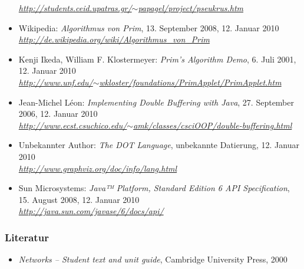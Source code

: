 \documentclass[a4paper,titlepage]{article}
\begin{document}
\begin{itemize}
	\emph{\href{http://students.ceid.upatras.gr/~papagel/project/pseukrus.htm}{http://students.ceid.upatras.gr/$\sim$papagel/project/pseukrus.htm}}
\item Wikipedia: \emph{Algorithmus von Prim}, 13. September 2008, 12. Januar 2010 \\
	\emph{\href{http://de.wikipedia.org/wiki/Algorithmus_von_Prim}{http://de.wikipedia.org/wiki/Algorithmus\_von\_Prim}}
\item Kenji Ikeda, William F. Klostermeyer: \emph{Prim's Algorithm Demo}, 6. Juli 2001, 12. Januar 2010 \\
	\emph{\href{http://www.unf.edu/~wkloster/foundations/PrimApplet/PrimApplet.htm}{http://www.unf.edu/$\sim$wkloster/foundations/PrimApplet/PrimApplet.htm}}
\item Jean-Michel Léon: \emph{Implementing Double Buffering with Java}, 27. September 2006, 12. Januar 2010 \\
	\emph{\href{http://www.ecst.csuchico.edu/~amk/classes/csciOOP/double-buffering.html}{http://www.ecst.csuchico.edu/$\sim$amk/classes/csciOOP/double-buffering.html}}
\item Unbekannter Author: \emph{The DOT Language}, unbekannte Datierung, 12. Januar 2010 \\
	\emph{\href{http://www.graphviz.org/doc/info/lang.html}{http://www.graphviz.org/doc/info/lang.html}}
\item Sun Microsystems: \emph{Java™ Platform, Standard Edition 6 API Specification}, 15. August 2008, 12. Januar 2010 \\
	\emph{\href{http://java.sun.com/javase/6/docs/api/}{http://java.sun.com/javase/6/docs/api/}}
\end{itemize}

\subsubsection{Literatur}
\begin{itemize}
\item \emph{Networks -- Student text and unit guide}, Cambridge University Press, 2000
\end{itemize}
\end{document}
